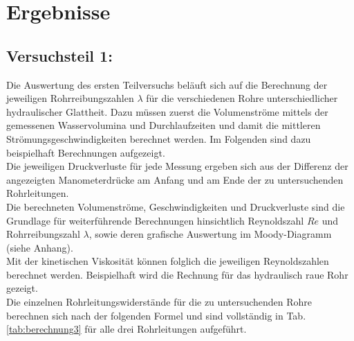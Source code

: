\section{Ergebnisse}
\label{sec:ergebnisse}

\subsection{Versuchsteil 1: }
Die Auswertung des ersten Teilversuchs beläuft sich auf die Berechnung der jeweiligen Rohrreibungszahlen $\lambda$ für die verschiedenen Rohre unterschiedlicher hydraulischer Glattheit. Dazu müssen zuerst die Volumenströme mittels der gemessenen Wasservolumina und Durchlaufzeiten und damit die mittleren Strömungsgeschwindigkeiten berechnet werden. Im Folgenden sind dazu beispielhaft Berechnungen aufgezeigt. \\ 
Die jeweiligen Druckverluste für jede Messung ergeben sich aus der Differenz der angezeigten Manometerdrücke am Anfang und am Ende der zu untersuchenden Rohrleitungen. \\
Die berechneten Volumenströme, Geschwindigkeiten und Druckverluste sind die Grundlage für weiterführende Berechnungen hinsichtlich Reynoldszahl $Re$ und Rohrreibungszahl $\lambda$, sowie deren grafische Auswertung im Moody-Diagramm \linebreak (siehe Anhang).\\
Mit der kinetischen Viskosität können folglich die jeweiligen Reynoldszahlen berechnet werden. Beispielhaft wird die Rechnung für das hydraulisch raue Rohr gezeigt.\\
Die einzelnen Rohrleitungswiderstände für die zu untersuchenden Rohre berechnen sich nach der folgenden Formel und sind vollständig in Tab. \ref{tab:berechnung3} für alle drei Rohrleitungen aufgeführt.

